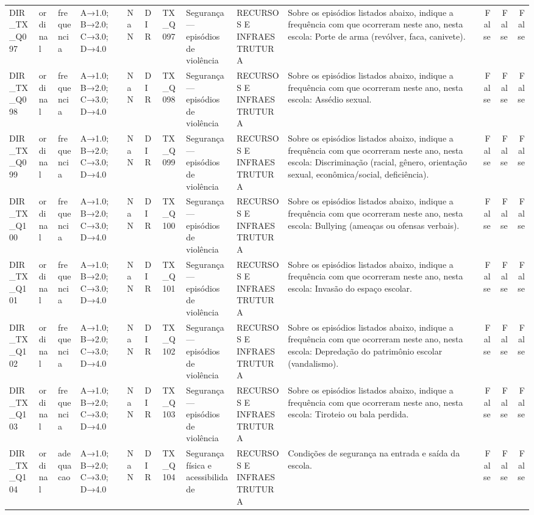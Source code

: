 \begin{tabular}{llllllllllrrr}
DIR\_TX\_Q097 & ordinal & frequencia & A→1.0; B→2.0; C→3.0; D→4.0 & NaN & DIR & TX\_Q097 & Segurança — episódios de violência & RECURSOS E INFRAESTRUTURA & Sobre os episódios listados abaixo, indique a frequência com que ocorreram neste ano, nesta escola: Porte de arma (revólver, faca, canivete). & False & False & False \\
DIR\_TX\_Q098 & ordinal & frequencia & A→1.0; B→2.0; C→3.0; D→4.0 & NaN & DIR & TX\_Q098 & Segurança — episódios de violência & RECURSOS E INFRAESTRUTURA & Sobre os episódios listados abaixo, indique a frequência com que ocorreram neste ano, nesta escola: Assédio sexual. & False & False & False \\
DIR\_TX\_Q099 & ordinal & frequencia & A→1.0; B→2.0; C→3.0; D→4.0 & NaN & DIR & TX\_Q099 & Segurança — episódios de violência & RECURSOS E INFRAESTRUTURA & Sobre os episódios listados abaixo, indique a frequência com que ocorreram neste ano, nesta escola: Discriminação (racial, gênero, orientação sexual, econômica/social, deficiência). & False & False & False \\
DIR\_TX\_Q100 & ordinal & frequencia & A→1.0; B→2.0; C→3.0; D→4.0 & NaN & DIR & TX\_Q100 & Segurança — episódios de violência & RECURSOS E INFRAESTRUTURA & Sobre os episódios listados abaixo, indique a frequência com que ocorreram neste ano, nesta escola: Bullying (ameaças ou ofensas verbais). & False & False & False \\
DIR\_TX\_Q101 & ordinal & frequencia & A→1.0; B→2.0; C→3.0; D→4.0 & NaN & DIR & TX\_Q101 & Segurança — episódios de violência & RECURSOS E INFRAESTRUTURA & Sobre os episódios listados abaixo, indique a frequência com que ocorreram neste ano, nesta escola: Invasão do espaço escolar. & False & False & False \\
DIR\_TX\_Q102 & ordinal & frequencia & A→1.0; B→2.0; C→3.0; D→4.0 & NaN & DIR & TX\_Q102 & Segurança — episódios de violência & RECURSOS E INFRAESTRUTURA & Sobre os episódios listados abaixo, indique a frequência com que ocorreram neste ano, nesta escola: Depredação do patrimônio escolar (vandalismo). & False & False & False \\
DIR\_TX\_Q103 & ordinal & frequencia & A→1.0; B→2.0; C→3.0; D→4.0 & NaN & DIR & TX\_Q103 & Segurança — episódios de violência & RECURSOS E INFRAESTRUTURA & Sobre os episódios listados abaixo, indique a frequência com que ocorreram neste ano, nesta escola: Tiroteio ou bala perdida. & False & False & False \\
DIR\_TX\_Q104 & ordinal & adequacao & A→1.0; B→2.0; C→3.0; D→4.0 & NaN & DIR & TX\_Q104 & Segurança física e acessibilidade & RECURSOS E INFRAESTRUTURA & Condições de segurança na entrada e saída da escola. & False & False & False \\

\end{tabular}

